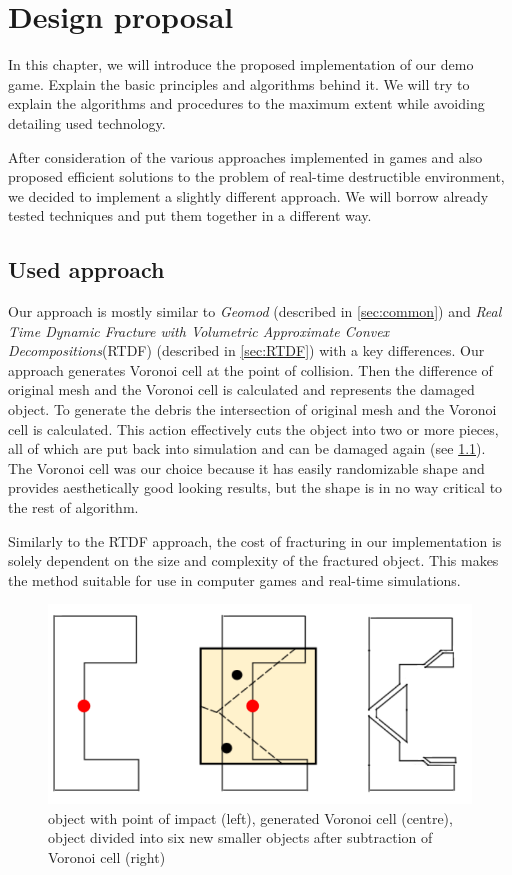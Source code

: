 \chapter{Design proposal}
In this chapter, we will introduce the proposed implementation of our demo game. Explain the basic principles and algorithms behind it. We will try to explain the algorithms and procedures to the maximum extent while avoiding detailing used technology.

After consideration of the various approaches implemented in games and also proposed efficient solutions to the problem of real-time destructible environment, we decided to implement a slightly different approach. We will borrow already tested techniques and put them together in a different way.

\section{Used approach}
Our approach is mostly similar to \emph{Geomod} (described in \cref{sec:common}) and \emph{Real Time Dynamic Fracture
with Volumetric Approximate Convex Decompositions}(RTDF) (described in \cref{sec:RTDF}) with a key differences. Our approach generates Voronoi cell at the point of collision. Then the difference of original mesh and the Voronoi cell is calculated and represents the damaged object. To generate the debris the intersection of original mesh and the Voronoi cell is calculated. This action effectively cuts the object into two or more pieces, all of which are put back into simulation and can be damaged again (see \cref{fig:subtraction}). The Voronoi cell was our choice because it has easily randomizable shape and provides aesthetically good looking results, but the shape is in no way critical to the rest of algorithm.

Similarly to the RTDF approach, the cost of fracturing in our implementation is solely dependent on the size and complexity of the fractured object.  This makes the method suitable for use in computer games and real-time simulations.

\begin{figure}
        \centering
        \includegraphics[width=\textwidth]{img/subtractionProcess}
        \caption{object with point of impact (left), generated Voronoi cell (centre), object divided into six new smaller objects after subtraction of Voronoi cell (right)}
        \label{fig:subtraction}
\end{figure}

